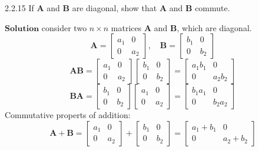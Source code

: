 $$$$

\begin{mybox}{2.2.15}
If $\mathbf{A}$ and $\mathbf{B}$ are diagonal, show that $\mathbf{A}$ and $\mathbf{B}$ commute.
\end{mybox}

$\boxed{\textbf{Solution}}$  consider two $n\times n$ matrices $\mathbf{A}$ and $\mathbf{B}$, which are diagonal.
$$\mathbf{A}=\left[\begin{array}{ll}{a_{1}} & {0} \\ {0} & {a_{2}}\end{array}\right], \quad \mathbf{B}=\left[\begin{array}{ll}{b_{1}} & {0} \\ {0} & {b_{2}}\end{array}\right]$$
$$\mathbf{A} \mathbf{B}=\left[\begin{array}{ll}{a_{1}} & {0} \\ {0} & {a_{2}}\end{array}\right]\left[\begin{array}{ll}{b_{1}} & {0} \\ {0} & {b_{2}}\end{array}\right]=\left[\begin{array}{cc}{a_{1} b_{1}} & {0} \\ {0} & {a_{2} b_{2}}\end{array}\right]$$
$$\mathbf{B} \mathbf{A}=\left[\begin{array}{ll}{b_{1}} & {0} \\ {0} & {b_{2}}\end{array}\right]\left[\begin{array}{ll}{a_{1}} & {0} \\ {0} & {a_{2}}\end{array}\right]=\left[\begin{array}{lll}{b_{1} a_{1}} & {0} \\ {0} & {b_{2} a_{2}}\end{array}\right]$$
Commutative properts of addition:
$$\mathbf{A}+\mathbf{B}=\left[\begin{array}{ll}{a_{1}} & {0} \\ {0} & {a_{2}}\end{array}\right]+\left[\begin{array}{ll}{b_{1}} & {0} \\ {0} & {b_{2}}\end{array}\right]=\left[\begin{array}{ccc}{a_{1}+b_{1}} & {0} \\ {0} & {a_{2}+b_{2}}\end{array}\right]$$
